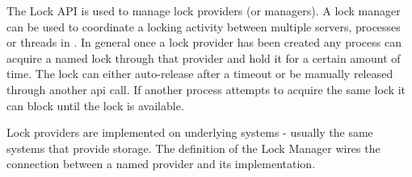 The Lock API is used to manage lock providers (or managers). A lock manager can be used to coordinate a locking
activity between multiple servers, processes or threads in \Rapture. In general once a lock provider has been created
any process can acquire a named lock through that provider and hold it for a certain amount of time. The lock can either
auto-release after a timeout or be manually released through another api call. If another process attempts to acquire the same lock
it can block until the lock is available.

Lock providers are implemented on underlying systems - usually the same systems that provide storage. The definition of the Lock Manager wires the connection between a named provider and its implementation.
